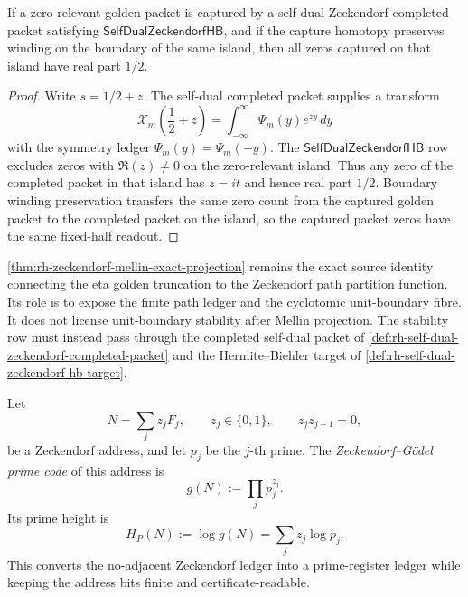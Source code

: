 \begin{theorem}
\label{thm:rh-self-dual-hb-gives-fixed-half-packet}
If a zero-relevant golden packet is captured by a self-dual Zeckendorf
completed packet satisfying $\mathsf{SelfDualZeckendorfHB}$, and if the
capture homotopy preserves winding on the boundary of the same island,
then all zeros captured on that island have real part $1/2$.
\end{theorem}

\begin{proof}
Write $s=1/2+z$.  The self-dual completed packet supplies a transform
$$
\mathcal X_m\left(\frac12+z\right)
=
\int_{-\infty}^{\infty}\Psi_m(y)e^{zy}\,dy
$$
with the symmetry ledger $\Psi_m(y)=\Psi_m(-y)$.  The
$\mathsf{SelfDualZeckendorfHB}$ row excludes zeros with $\Re(z)\ne0$ on
the zero-relevant island.  Thus any zero of the completed packet in that
island has $z=it$ and hence real part $1/2$.  Boundary winding
preservation transfers the same zero count from the captured golden
packet to the completed packet on the island, so the captured packet
zeros have the same fixed-half readout.
\end{proof}

\begin{principle}
\label{prin:rh-one-sided-mellin-source-not-stability-row}
\autoref{thm:rh-zeckendorf-mellin-exact-projection} remains the exact
source identity connecting the eta golden truncation to the
Zeckendorf path partition function.  Its role is to expose the finite
path ledger and the cyclotomic unit-boundary fibre.  It does not license
unit-boundary stability after Mellin projection.  The stability row must
instead pass through the completed self-dual packet of
\autoref{def:rh-self-dual-zeckendorf-completed-packet} and the
Hermite--Biehler target of
\autoref{def:rh-self-dual-zeckendorf-hb-target}.
\end{principle}

\begin{definition}
\label{def:rh-zeckendorf-godel-prime-code}
Let
$$
N=\sum_{j} z_jF_j,
\qquad
z_j\in\{0,1\},
\qquad
z_jz_{j+1}=0,
$$
be a Zeckendorf address, and let $p_j$ be the $j$-th prime.  The
\emph{Zeckendorf--G\"odel prime code} of this address is
$$
g(N):=\prod_j p_j^{z_j}.
$$
Its prime height is
$$
H_P(N):=\log g(N)=\sum_j z_j\log p_j.
$$
This converts the no-adjacent Zeckendorf ledger into a prime-register
ledger while keeping the address bits finite and certificate-readable.
\end{definition}

